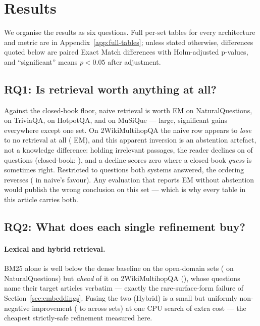 \section{Results}
\label{sec:results}

We organise the results as six questions. Full per-set tables for every
architecture and metric are in Appendix~\ref{app:full-tables}; unless
stated otherwise, differences quoted below are paired Exact Match
differences with Holm-adjusted p-values, and ``significant'' means
$p<0.05$ after adjustment.

\subsection{RQ1: Is retrieval worth anything at all?}
\label{sec:results-worth}

Against the closed-book floor, naive retrieval is worth
\ClosedBookVsNaiveNQExactMatchDiff{} EM on NaturalQuestions,
\ClosedBookVsNaiveTriviaQAExactMatchDiff{} on TriviaQA,
\ClosedBookVsNaiveHotpotQAExactMatchDiff{} on HotpotQA, and
\ClosedBookVsNaiveMuSiQueExactMatchDiff{} on MuSiQue --- large,
significant gains everywhere except one set. On 2WikiMultihopQA the naive
row appears to \emph{lose} to no retrieval at all
(\ClosedBookVsNaiveTwoWikiExactMatchDiff{} EM), and this apparent
inversion is an abstention artefact, not a knowledge difference: holding
irrelevant passages, the reader declines on
\NaiveRAGTwoWikiAbstentionRate{} of questions (closed-book:
\ClosedBookTwoWikiAbstentionRate), and a decline scores zero where a
closed-book \emph{guess} is sometimes right. Restricted to questions both
systems answered, the ordering reverses
(\ClosedBookVsNaiveTwoWikiEMbothansweredDiff{} in naive's favour). Any
evaluation that reports EM without abstention would publish the wrong
conclusion on this set --- which is why every table in this article
carries both.

\subsection{RQ2: What does each single refinement buy?}
\label{sec:results-single}

\paragraph{Lexical and hybrid retrieval.} BM25 alone is well below the
dense baseline on the open-domain sets
(\NaiveVsBMTwentyFiveNQExactMatchDiff{} on NaturalQuestions) but
\emph{ahead} of it on 2WikiMultihopQA
(\NaiveVsBMTwentyFiveTwoWikiExactMatchDiff), whose questions name their
target articles verbatim --- exactly the rare-surface-form failure of
Section~\ref{sec:embeddings}. Fusing the two (Hybrid) is a small but
uniformly non-negative improvement
(\NaiveVsHybridNQExactMatchDiff{} to
\NaiveVsHybridTwoWikiExactMatchDiff{} across sets) at one CPU search of
extra cost --- the cheapest strictly-safe refinement measured here.

